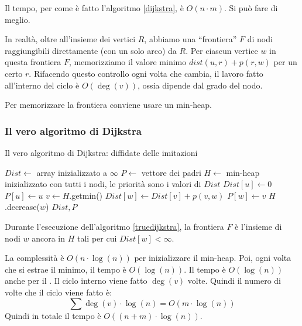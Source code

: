 Il tempo, per come \`e fatto l'algoritmo \ref{dijkstra}, \`e $O(n \cdot m)$. Si pu\`o fare di meglio.

In realt\`a, oltre all'insieme dei vertici $R$, abbiamo una ``frontiera'' $F$ di nodi raggiungibili direttamente (con un solo arco) da $R$. Per ciascun vertice $w$ in questa frontiera $F$, memorizziamo il valore minimo $dist(u,r) + p(r,w)$ per un certo $r$. Rifacendo questo controllo ogni volta che cambia, il lavoro fatto all'interno del ciclo  \`e $O(\deg(v))$, ossia dipende dal grado del nodo.

Per memorizzare la frontiera conviene usare un min-heap.

\subsubsection{Il vero algoritmo di Dijkstra}

\begin{algorithm}
\caption{\label{truedijkstra}Il vero algoritmo di Dijkstra: diffidate delle imitazioni}
\begin{algorithmic}[1]
    \State $Dist \gets$ array inizializzato a $\infty$
    \State $P \gets$ vettore dei padri
    \State $H \gets$ min-heap inizializzato con tutti i nodi, le priorit\`a sono i valori di $Dist$
    \State $Dist[u] \gets 0$
    \State $P[u] \gets u$
        \State $v \gets H$.getmin()
                \State $Dist[w] \gets Dist[v] + p(v,w)$
                \State $P[w] \gets v$
                \State $H$.decrease($w$)
            \EndIf
        \EndFor
    \EndWhile
    \State \Return $Dist, P$
\EndFunction
\end{algorithmic}
\end{algorithm}

Durante l'esecuzione dell'algoritmo \ref{truedijkstra}, la frontiera $F$ \`e l'insieme di nodi $w$ ancora in $H$ tali per cui $Dist[w] < \infty$.

La complessit\`a \`e $O(n \cdot \log(n))$ per inizializzare il min-heap. Poi, ogni volta che si estrae il minimo, il tempo \`e $O(\log(n))$. Il tempo \`e $O(\log(n))$ anche per il . Il ciclo  interno viene fatto $\deg(v)$ volte. Quindi il numero di volte che il ciclo  viene fatto \`e:
\[
\sum \deg(v) \cdot \log(n) = O(m \cdot \log(n))
\]
Quindi in totale il tempo \`e $O((n + m) \cdot \log(n))$.

